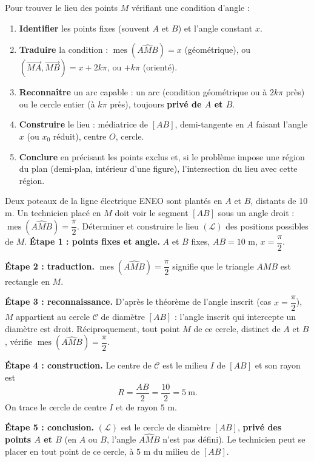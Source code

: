 \documentclass[11pt]{article}
\begin{document}
\begin{methode}
Pour trouver le lieu des points $M$ vérifiant une condition d'angle :
\begin{enumerate}
\item \textbf{Identifier} les points fixes (souvent $A$ et $B$) et l'angle constant $x$.
\item \textbf{Traduire} la condition : $\operatorname{mes}(\widehat{AMB})=x$ (géométrique), ou $(\overrightarrow{MA},\overrightarrow{MB})=x+2k\pi$, ou $+k\pi$ (orienté).
\item \textbf{Reconnaître} un arc capable : un arc (condition géométrique ou à $2k\pi$ près) ou le cercle entier (à $k\pi$ près), toujours \textbf{privé de $A$ et $B$}.
\item \textbf{Construire} le lieu : médiatrice de $[AB]$, demi-tangente en $A$ faisant l'angle $x$ (ou $x_0$ réduit), centre $O$, cercle.
\item \textbf{Conclure} en précisant les points exclus et, si le problème impose une région du plan (demi-plan, intérieur d'une figure), l'intersection du lieu avec cette région.
\end{enumerate}
\end{methode}

\begin{exoresolu}
Deux poteaux de la ligne électrique ENEO sont plantés en $A$ et $B$, distants de $10$ m. Un technicien placé en $M$ doit voir le segment $[AB]$ sous un angle droit : $\operatorname{mes}(\widehat{AMB})=\dfrac{\pi}{2}$. Déterminer et construire le lieu $(\mathcal{L})$ des positions possibles de $M$.
\tcblower
\textbf{Étape 1 : points fixes et angle.} $A$ et $B$ fixes, $AB=10$ m, $x=\dfrac{\pi}{2}$.

\textbf{Étape 2 : traduction.} $\operatorname{mes}(\widehat{AMB})=\dfrac{\pi}{2}$ signifie que le triangle $AMB$ est rectangle en $M$.

\textbf{Étape 3 : reconnaissance.} D'après le théorème de l'angle inscrit (cas $x=\dfrac{\pi}{2}$), $M$ appartient au cercle $\mathcal{C}$ de diamètre $[AB]$ : l'angle inscrit qui intercepte un diamètre est droit. Réciproquement, tout point $M$ de ce cercle, distinct de $A$ et $B$, vérifie $\operatorname{mes}(\widehat{AMB})=\dfrac{\pi}{2}$.

\textbf{Étape 4 : construction.} Le centre de $\mathcal{C}$ est le milieu $I$ de $[AB]$ et son rayon est
\[
R=\frac{AB}{2}=\frac{10}{2}=5\ \text{m}.
\]
On trace le cercle de centre $I$ et de rayon $5$ m.

\textbf{Étape 5 : conclusion.} $(\mathcal{L})$ est le cercle de diamètre $[AB]$, \textbf{privé des points $A$ et $B$} (en $A$ ou $B$, l'angle $\widehat{AMB}$ n'est pas défini). Le technicien peut se placer en tout point de ce cercle, à $5$ m du milieu de $[AB]$.
\end{exoresolu}
\end{document}
